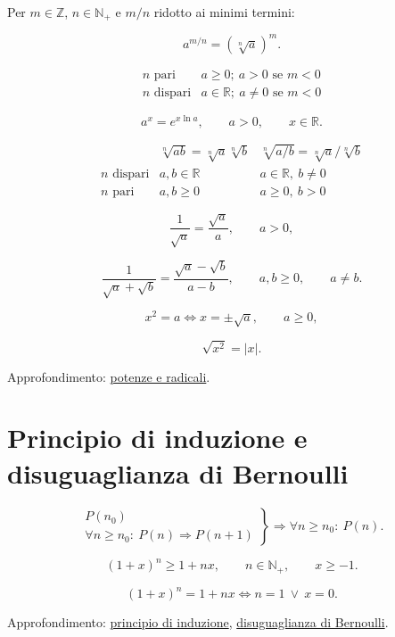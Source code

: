 Per \(m\in\mathbb Z\), \(n\in\mathbb N_+\) e \(m/n\) ridotto ai minimi termini:

\[
a^{m/n}=(\sqrt[n]{a})^m.
\]

\[
\begin{array}{c|c}
n\text{ pari}&a\ge0;\ a>0\text{ se }m<0\\
n\text{ dispari}&a\in\mathbb R;\ a\ne0\text{ se }m<0
\end{array}
\]

\[
a^x=e^{x\ln a},
\qquad a>0,
\qquad x\in\mathbb R.
\]

\[
\begin{array}{c|c|c}
&\sqrt[n]{ab}=\sqrt[n]a\sqrt[n]b
&\sqrt[n]{a/b}=\sqrt[n]a/\sqrt[n]b\\
\hline
n\text{ dispari}&a,b\in\mathbb R&a\in\mathbb R,\ b\ne0\\
n\text{ pari}&a,b\ge0&a\ge0,\ b>0
\end{array}
\]

\[
\frac1{\sqrt a}=\frac{\sqrt a}{a},
\qquad a>0,
\]

\[
\frac1{\sqrt a+\sqrt b}
=\frac{\sqrt a-\sqrt b}{a-b},
\qquad a,b\ge0,
\qquad a\ne b.
\]

\[
x^2=a
\Longleftrightarrow
x=\pm\sqrt a,
\qquad a\ge0,
\]

\[
\sqrt{x^2}=\lvert x\rvert.
\]

Approfondimento: \href{https://ingegnerismo.it/matematica/potenze-e-radicali/}{potenze e radicali}.

\section{Principio di induzione e disuguaglianza di Bernoulli}\label{principio-di-induzione-e-disuguaglianza-di-bernoulli}

\[
\left.
\begin{array}{l}
P(n_0)\\
\forall n\ge n_0:\ P(n)\Rightarrow P(n+1)
\end{array}
\right\}
\Longrightarrow
\forall n\ge n_0:\ P(n).
\]

\[
(1+x)^n\ge1+nx,
\qquad
n\in\mathbb N_+,
\qquad
x\ge-1.
\]

\[
(1+x)^n=1+nx
\Longleftrightarrow
n=1\ \lor\ x=0.
\]

Approfondimento: \href{https://ingegnerismo.it/matematica/principio-di-induzione/}{principio di induzione}, \href{https://ingegnerismo.it/matematica/disuguaglianza-di-bernoulli/}{disuguaglianza di Bernoulli}.

